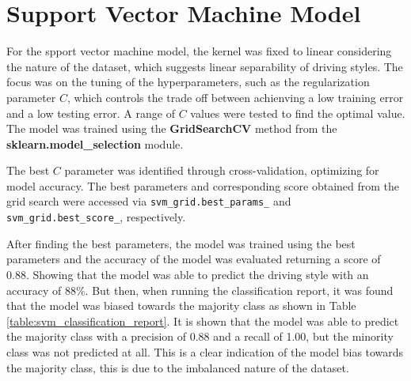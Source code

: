 \section{Support Vector Machine Model}
For the spport vector machine model, the kernel was fixed to linear considering the nature of the dataset, which suggests linear separability of driving styles. The focus was on the tuning
of the hyperparameters, such as the regularization parameter $C$, which controls the trade off between achienving a low training error and a low testing error. 
A range of $C$ values were tested to find the optimal value. The model was trained using the \textbf{GridSearchCV} method from the \textbf{sklearn.model\_selection} module.

The best $C$ parameter was identified through cross-validation, optimizing for model accuracy. The best parameters and corresponding score obtained from the grid search were 
accessed via \texttt{svm\_grid.best\_params\_} and \texttt{svm\_grid.best\_score\_}, respectively.

After finding the best parameters, the model was trained using the best parameters and the accuracy of the model was evaluated returning a score of 0.88. Showing that the model was able 
to predict the driving style with an accuracy of 88\%. But then, when running the classification report, it was found that the model was biased towards the majority class as shown in Table
\ref{table:svm_classification_report}. It is shown that the model was able to predict the majority class with a precision of 0.88 and a recall of 1.00, but the minority class was not
predicted at all. This is a clear indication of the model bias towards the majority class, this is due to the imbalanced nature of the dataset.

